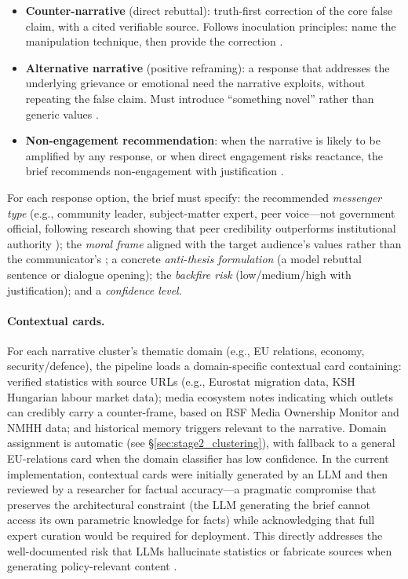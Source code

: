 \documentclass[10pt, a4paper]{article}
\begin{document}
\begin{itemize}
\item \textbf{Counter-narrative} (direct rebuttal): truth-first correction of the core false claim, with a cited verifiable source. Follows inoculation principles: name the manipulation technique, then provide the correction \citep{vanderlinden2017inoculating}.
\item \textbf{Alternative narrative} (positive reframing): a response that addresses the underlying grievance or emotional need the narrative exploits, without repeating the false claim. Must introduce ``something novel'' rather than generic values \citep{ran2022alternative}.
\item \textbf{Non-engagement recommendation}: when the narrative is likely to be amplified by any response, or when direct engagement risks reactance, the brief recommends non-engagement with justification \citep{resist2019}.
\end{itemize}

\noindent For each response option, the brief must specify: the recommended \textit{messenger type} (e.g., community leader, subject-matter expert, peer voice---not government official, following research showing that peer credibility outperforms institutional authority \citep{speckhard2018breaking, braddock2020countering}); the \textit{moral frame} aligned with the target audience's values rather than the communicator's \citep{feinberg2015moral}; a concrete \textit{anti-thesis formulation} (a model rebuttal sentence or dialogue opening); the \textit{backfire risk} (low/medium/high with justification); and a \textit{confidence level}.

\paragraph{Contextual cards.}
For each narrative cluster's thematic domain (e.g., EU relations, economy, security/defence), the pipeline loads a domain-specific contextual card containing: verified statistics with source URLs (e.g., Eurostat migration data, KSH Hungarian labour market data); media ecosystem notes indicating which outlets can credibly carry a counter-frame, based on RSF Media Ownership Monitor and NMHH data; and historical memory triggers relevant to the narrative. Domain assignment is automatic (see \S\ref{sec:stage2_clustering}), with fallback to a general EU-relations card when the domain classifier has low confidence. In the current implementation, contextual cards were initially generated by an LLM and then reviewed by a researcher for factual accuracy---a pragmatic compromise that preserves the architectural constraint (the LLM generating the brief cannot access its own parametric knowledge for facts) while acknowledging that full expert curation would be required for deployment. This directly addresses the well-documented risk that LLMs hallucinate statistics or fabricate sources when generating policy-relevant content \citep{mckenna2023sources}.
\end{document}
